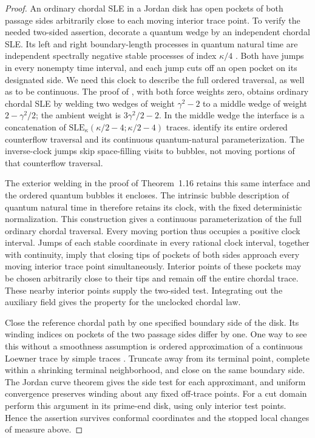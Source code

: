 \documentclass[11pt]{article}
\numberwithin{equation}{section}
\theoremstyle{definition}
\theoremstyle{remark}
\newcommand{\1}{\mathbf 1}
\begin{document}
\begin{proof}
An ordinary chordal SLE in a Jordan disk has open pockets of both
passage sides arbitrarily close to each moving interior trace point.
To verify the needed two-sided assertion, decorate a quantum wedge by
an independent chordal SLE.  Its left and right boundary-length
processes in quantum natural time are independent spectrally negative
stable processes of index $\kappa/4$
\cite[Theorem~10.1]{DMSMating}.  Both have jumps in every nonempty time
interval, and each jump cuts off an open pocket on its designated side.
We need this clock to describe the full ordered traversal, as well
as to be continuous.  The proof of \cite[Theorem~1.16]{DMSMating},
with both force weights zero, obtains ordinary chordal SLE by welding
two wedges of weight $\gamma^2-2$ to a middle wedge of weight
$2-\gamma^2/2$; the ambient weight is $3\gamma^2/2-2$.
In the middle wedge the interface is a concatenation of
$\mathrm{SLE}_{\kappa}(\kappa/2-4;\kappa/2-4)$ traces.
 identify its entire
ordered counterflow traversal and its continuous quantum-natural
parameterization.  The inverse-clock jumps skip space-filling visits
to bubbles, not moving portions of that counterflow traversal.

The exterior welding in the proof of Theorem~1.16 retains this same
interface and the ordered quantum bubbles it encloses.  The intrinsic
bubble description of quantum natural time in
\cite[Theorem~6.22, Definition~6.23 and Remark~10.5]{DMSMating}
therefore retains its clock, with the fixed deterministic normalization.
This construction gives a continuous parameterization of the full
ordinary chordal traversal.  Every moving portion thus occupies a
positive clock interval.  Jumps of each stable coordinate in every
rational clock interval, together with continuity, imply that closing
tips of pockets of both sides approach every moving interior trace
point simultaneously.  Interior points of these pockets may be chosen
arbitrarily close to their tips and remain off the entire chordal
trace.  These nearby interior points supply the two-sided test.
Integrating out the auxiliary field
gives the property for the unclocked chordal law.

Close the reference chordal path by one specified boundary side of the
disk.  Its winding indices on pockets of the two passage sides differ
by one.  One way to see this without a smoothness assumption is ordered
approximation of a continuous Loewner trace by simple traces
\cite[Theorem~1.1]{YuanLoewnerTraces}.  Truncate away from its terminal
point, complete within a shrinking terminal neighborhood, and close
on the same boundary side.  The Jordan curve theorem gives the side
test for each approximant, and uniform convergence preserves winding
about any fixed off-trace points.  For a cut domain perform this argument
in its prime-end disk, using only interior test points.  Hence the
assertion survives conformal coordinates and the stopped local changes
of measure above.


\end{proof}
\end{document}
